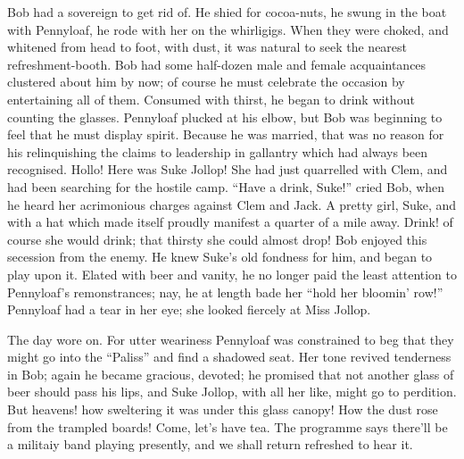 Bob had a sovereign to get rid of. He shied for cocoa-nuts, he swung in
the boat with Pennyloaf, he rode with her on the whirligigs. When they
were choked, and whitened from head to foot, with dust, it was natural
to seek the nearest refreshment-booth. Bob had some half-dozen male and
female acquaintances clustered about him by now; of course he must
celebrate the occasion by entertaining all of them. Consumed with
thirst, he began to drink without counting the glasses. Pennyloaf
plucked at his elbow, but Bob was beginning to feel that he must display
spirit. Because he was married, that was no reason for his relinquishing
the claims to leadership in gallantry which had always been recognised.
Hollo! Here was Suke Jollop! She had just quarrelled with Clem, and had
been searching for the hostile camp. {}``Have a drink, Suke!'' cried
Bob, when he heard her acrimonious charges against Clem and Jack. A
pretty girl, Suke, and with a hat which made itself proudly manifest a
quarter of a mile away. Drink! of course she would drink; that thirsty
she could almost drop! Bob enjoyed this secession from the enemy. He
knew Suke's old fondness for him, and began to play upon it. Elated with
beer and vanity, he no longer paid the least attention to Pennyloaf's
remonstrances; nay, he at length bade her ``hold her bloomin' row!''
Pennyloaf had a tear in her eye; she looked fiercely at Miss Jollop.

The day wore on. For utter weariness Pennyloaf was constrained to beg
that they might go into the ``Paliss'' and find a shadowed seat. Her
tone revived tenderness in Bob; again he became gracious, devoted; he
promised that not another glass of beer should pass his lips, and Suke
Jollop, with all her like, might go to perdition. But heavens! how
sweltering it was under this glass canopy! How the dust rose from the
trampled boards! {}Come, let's have tea. The programme says there'll be
a militaiy band playing presently, and we shall return refreshed to hear
it.

